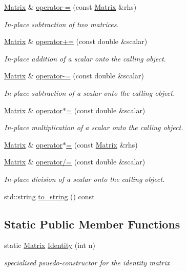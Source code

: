 \begin{DoxyCompactItemize}
$$\hyperlink{classJSL_1_1Matrix}{Matrix} \& \hyperlink{classJSL_1_1Matrix_abec89912c20210f6b49c5d09e1c1845b}{operator-\/=} (const \hyperlink{classJSL_1_1Matrix}{Matrix} \&rhs)
\begin{DoxyCompactList}\small\item\em In-\/place subtraction of two matrices. \end{DoxyCompactList}\item 
\hyperlink{classJSL_1_1Matrix}{Matrix} \& \hyperlink{classJSL_1_1Matrix_ae2dfa2fcbc80ee24c02125e5739bc0c1}{operator+=} (const double \&scalar)
\begin{DoxyCompactList}\small\item\em In-\/place addition of a scalar onto the calling object. \end{DoxyCompactList}\item 
\hyperlink{classJSL_1_1Matrix}{Matrix} \& \hyperlink{classJSL_1_1Matrix_a894ff64b1350616ddf2a48ec0f58e2c5}{operator-\/=} (const double \&scalar)
\begin{DoxyCompactList}\small\item\em In-\/place subtraction of a scalar onto the calling object. \end{DoxyCompactList}\item 
\hyperlink{classJSL_1_1Matrix}{Matrix} \& \hyperlink{classJSL_1_1Matrix_a3d9d4857ed227d7c6db87814f15af2ea}{operator$\ast$=} (const double \&scalar)
\begin{DoxyCompactList}\small\item\em In-\/place multiplication of a scalar onto the calling object. \end{DoxyCompactList}\item 
\hyperlink{classJSL_1_1Matrix}{Matrix} \& \hyperlink{classJSL_1_1Matrix_a2a9cdd54f835135496bf3e87aea4dfc9}{operator$\ast$=} (const \hyperlink{classJSL_1_1Matrix}{Matrix} \&rhs)
\item 
\hyperlink{classJSL_1_1Matrix}{Matrix} \& \hyperlink{classJSL_1_1Matrix_a6caa5725c4dacc9a841147e80e9c43a4}{operator/=} (const double \&scalar)
\begin{DoxyCompactList}\small\item\em In-\/place division of a scalar onto the calling object. \end{DoxyCompactList}\item 
std\+::string \hyperlink{classJSL_1_1Matrix_abcf44559767ab6939851f0d3b60c6fa8}{to\+\_\+string} () const
\end{DoxyCompactItemize}
\subsection*{Static Public Member Functions}
\begin{DoxyCompactItemize}
\item 
static \hyperlink{classJSL_1_1Matrix}{Matrix} \hyperlink{classJSL_1_1Matrix_afd9edd73e5f559eed02b063d4c4e47f8}{Identity} (int n)
\begin{DoxyCompactList}\small\item\em specialised psuedo-\/constructor for the identity matrix \end{DoxyCompactList}\end{DoxyCompactItemize}
